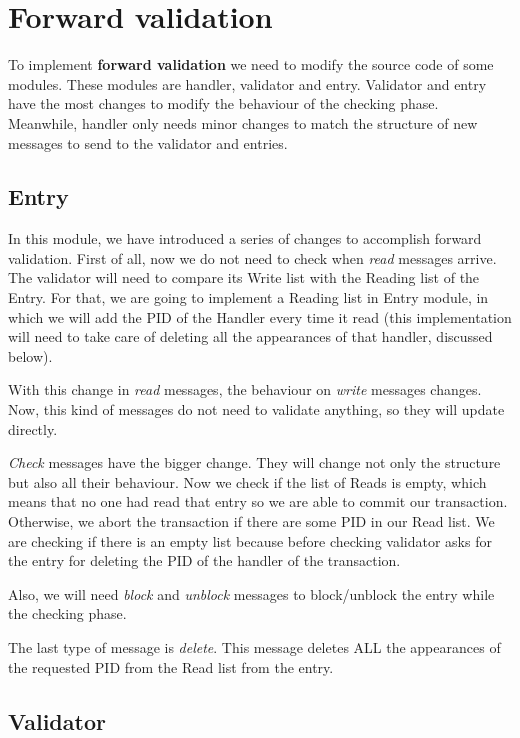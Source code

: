 \documentclass[a4paper, 10pt]{article}
\begin{document}
\clearpage


\section{Forward validation}

To implement \textbf{forward validation} we need to modify the source code of some modules. These modules are handler, validator and entry. Validator and entry have the most changes to modify the behaviour of the checking phase. Meanwhile, handler only needs minor changes to match the structure of new messages to send to the validator and entries.

\subsection{Entry}

In this module, we have introduced a series of changes to accomplish forward validation. First of all, now we do not need to check when \textit{read} messages arrive. The validator will need to compare its Write list with the Reading list of the Entry. For that, we are going to implement a Reading list in Entry module, in which we will add the PID of the Handler every time it read (this implementation will need to take care of deleting all the appearances of that handler, discussed below).

With this change in \textit{read} messages, the behaviour on \textit{write} messages changes. Now, this kind of messages do not need to validate anything, so they will update directly.

\textit{Check} messages have the bigger change. They will change not only the structure but also all their behaviour. Now we check if the list of Reads is empty, which means that no one had read that entry so we are able to commit our transaction. Otherwise, we abort the transaction if there are some PID in our Read list. We are checking if there is an empty list because before checking validator asks for the entry for deleting the PID of the handler of the transaction.

Also, we will need \textit{block} and \textit{unblock} messages to block/unblock the entry while the checking phase.

The last type of message is \textit{delete}. This message deletes ALL the appearances of the requested PID from the Read list from the entry.

\subsection{Validator}
\end{document}
